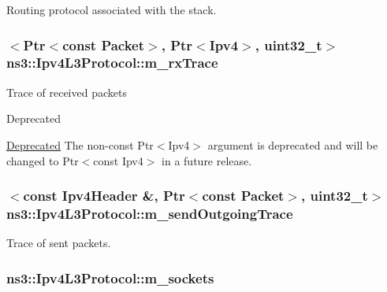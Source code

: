 Routing protocol associated with the stack. 

\subsubsection[{\texorpdfstring{m\+\_\+rx\+Trace}{m_rxTrace}}]{$<${\bf Ptr}$<$const {\bf Packet}$>$, {\bf Ptr}$<${\bf Ipv4}$>$, uint32\+\_\+t$>$ ns3\+::\+Ipv4\+L3\+Protocol\+::m\+\_\+rx\+Trace\hspace{0.3cm}{\ttfamily [private]}}\hypertarget{classns3_1_1Ipv4L3Protocol_a8a973a63eb239c315d630c9ff300823a}{}\label{classns3_1_1Ipv4L3Protocol_a8a973a63eb239c315d630c9ff300823a}
Trace of received packets \begin{DoxyRefDesc}{Deprecated}
\item[\hyperlink{deprecated__deprecated000009}{Deprecated}]The non-\/const {\ttfamily Ptr$<$\+Ipv4$>$} argument is deprecated and will be changed to {\ttfamily Ptr$<$const Ipv4$>$} in a future release. \end{DoxyRefDesc}
\subsubsection[{\texorpdfstring{m\+\_\+send\+Outgoing\+Trace}{m_sendOutgoingTrace}}]{$<$const {\bf Ipv4\+Header} \&, {\bf Ptr}$<$const {\bf Packet}$>$, uint32\+\_\+t$>$ ns3\+::\+Ipv4\+L3\+Protocol\+::m\+\_\+send\+Outgoing\+Trace\hspace{0.3cm}{\ttfamily [private]}}\hypertarget{classns3_1_1Ipv4L3Protocol_a909297aa7ca87db2b7c91daefa2ed40a}{}\label{classns3_1_1Ipv4L3Protocol_a909297aa7ca87db2b7c91daefa2ed40a}


Trace of sent packets. 

\subsubsection[{\texorpdfstring{m\+\_\+sockets}{m_sockets}}]{ ns3\+::\+Ipv4\+L3\+Protocol\+::m\+\_\+sockets\hspace{0.3cm}{\ttfamily [private]}}\hypertarget{classns3_1_1Ipv4L3Protocol_a5f3749c4a9bc9ee5a75f73c33f64aa7c}{}\label{classns3_1_1Ipv4L3Protocol_a5f3749c4a9bc9ee5a75f73c33f64aa7c}


